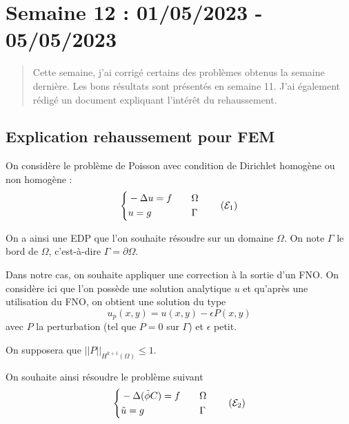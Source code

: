 \section{Semaine 12 : 01/05/2023 - 05/05/2023}
\graphicspath{{semaines/semaine_12/images/}}

\begin{abstract}
	Cette semaine, j'ai corrigé certains des problèmes obtenus la semaine dernière. Les bons résultats sont présentés en semaine 11. J'ai également rédigé un document expliquant l'intérêt du rehaussement.
\end{abstract}

\setlength\parindent{0pt}

\subsection{Explication rehaussement pour FEM \faBookmarkO}

On considère le problème de Poisson avec condition de Dirichlet homogène ou non homogène :
\begin{equation}
	\label{pb1}
	\left\{\begin{aligned}
		&-\Delta u=f \quad &&\Omega \\
		&u=g \quad &&\Gamma
	\end{aligned}\right. \tag{$\mathcal{E}_1$}
\end{equation}

On a ainsi une EDP que l'on souhaite résoudre sur un domaine $\Omega$. On note $\Gamma$ le bord de $\Omega$, c'est-à-dire $\Gamma=\partial\Omega$. 

Dans notre cas, on souhaite appliquer une correction à la sortie d'un FNO.
On considère ici que l'on possède une solution analytique $u$ et qu'après une utilisation du FNO, on obtient une solution du type
\begin{equation}
	\label{phi_tild}
	u_p(x,y) = u(x,y)-\epsilon P(x,y)
\end{equation}
avec $P$ la perturbation (tel que $P=0$ sur $\Gamma$) et $\epsilon$ petit.

On supposera que $||P||_{H^{k+1}(\Omega)}\le 1$.

On souhaite ainsi résoudre le problème suivant
\begin{equation}
	\label{pb2}
	\left\{\begin{aligned}
		&-\Delta (\tilde{\phi}C)=f \quad &&\Omega \\
		&\tilde{u}=g \quad &&\Gamma
	\end{aligned}\right. \tag{$\mathcal{E}_2$}
\end{equation}

